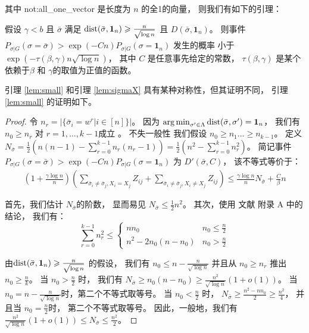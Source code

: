 其中 \gls{not:all_one_vector}
是长度为 $n$ 的全1的向量，
则我们有如下的引理：
 \begin{lemma}\label{lem:small}
	假设 $\gamma < b $ 且 $\bar{\sigma}$
  满足 
  $\operatorname{dist}(\bar{\sigma}, \mathbf{1}_n) \geqslant \frac{n}{\sqrt{\log  n}}$
	且 $D(\bar{\sigma}, \mathbf{1}_n)$。
	则事件
	$P_{\sigma | G}(\sigma = \bar{\sigma} ) > \exp(-Cn) P_{\sigma | G}(\sigma = \mathbf{1}_n)$
	发生的概率 小于 $\exp(-\tau(\beta, \gamma) n \sqrt{\log  n} )$，
  其中 $C$ 是任意事先给定的常数，
  $\tau(\beta, \gamma)$ 是某个依赖于$\beta$ 和 $\gamma$的取值为正值的函数。
\end{lemma}
引理 \ref{lem:small} 和引理 \ref{lem:sigmaX}  具有某种对称性，但其证明不同，
引理 \ref{lem:small} 的证明如下。
\begin{proof}
	令 $n_r = |\{\bar{\sigma}_i = w^r | i\in [n] \}|$。
  因为 $\operatorname*{arg\,min}_{\sigma'\in \Lambda} \operatorname{dist}(\bar{\sigma}, \sigma') = \mathbf{1}_n$，
  我们有 $n_0 \geq n_r$ 对 $r=1, \dots, k-1$成立 
  。
	不失一般性 我们假设 \mbox{$n_0 \geq n_1 \dots \geq n_{k-1}$}。
	定义
  $N_{\bar{\sigma}} = \frac{1}{2}(n(n-1) - \sum_{r=0}^{k-1} n_r(n_r-1))
	=\frac{1}{2}(n^2 - \sum_{r=0}^{k-1} n_r^2)$。
	简记事件
  $P_{\sigma | G}(\sigma = \bar{\sigma} ) > \exp(-Cn) P_{\sigma | G}(\sigma = \mathbf{1}_n)$ 为
  $D'(\bar{\sigma}, C)$，
	该不等式等价于：
\begin{align}
	\left(1 + \frac{\gamma \log n}{n}\right)
	\left( \sum_{\bar{\sigma}_i  \neq \bar{\sigma}_j, X_i = X_j} Z_{ij} +
	\sum_{\bar{\sigma}_i  \neq \bar{\sigma}_j, X_i \neq X_j} Z_{ij} \right)
	\leq \frac{\gamma \log n}{n} N_{\bar{\sigma}} + \frac{C}{\beta} n\label{eq:small}
\end{align}
		
	首先，我们估计 $N_{\bar{\sigma}}$的阶数，
  显而易见 $N_{\bar{\sigma}} \leq \frac{1}{2} n^2$。
	其次，使用 文献 附录 A 中的结论，
  我们有：
\begin{equation}
	\sum_{r=0}^{k-1} n_r^2 \leq
	\begin{cases}
	n n_0 & n_0 \leq \frac{n}{2} \\
	n^2 - 2n_0(n-n_0) & n_0 > \frac{n}{2}
	\end{cases}
	\end{equation}
	
	由$\operatorname{dist}(\bar{\sigma}, \mathbf{1}_n) \geqslant \frac{n}{\sqrt{\log n}}$
  的假设，
  我们有 $n_0 \leq n - \frac{n}{\sqrt{\log n}}$
	并且从 $n_0 \geq n_r$ 推出 $n_0 \geq \frac{n}{k}$。
	当 $n_0 > \frac{n}{2}$ 时，
	我们有
  $N_{\bar{\sigma}} \geq n_0 (n - n_0) \geq \frac{n^2}{\sqrt{\log n}}(1+o(1))$。
	当 $n_0 = n - \frac{n}{\sqrt{\log n}}$时，第二个不等式取等号。
  当 $n_0 < \frac{n}{2}$ 时，
	$N_{\bar{\sigma}} \geq \frac{n^2 - nn_0}{2} \geq \frac{n^2}{4}$，
  并且当 $n_0 = \frac{n}{2}$时，
  第二个不等式取等号。
	因此，一般地，我们有 $\frac{n^2}{\sqrt{\log n}}(1+o(1)) \leq N_{\bar{\sigma}} \leq \frac{n^2}{2}$。
	

\end{proof}
